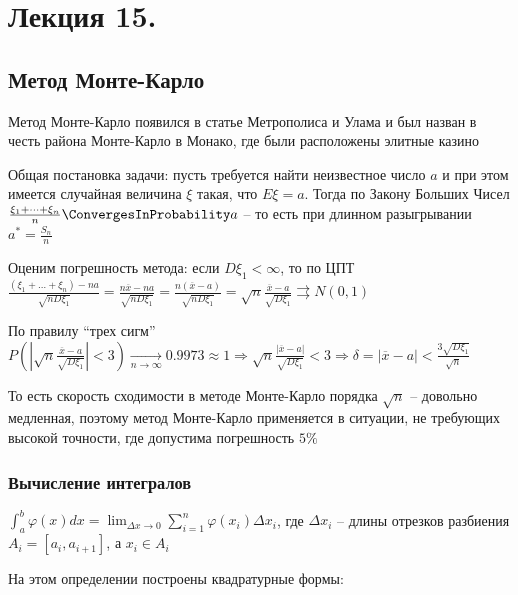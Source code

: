 \documentclass[12pt]{article}
\begin{document}





\section{Лекция 15.}

\subsection{Метод Монте-Карло}

\hypertarget{monte_carlo}{}

Метод Монте-Карло появился в статье Метрополиса и Улама и был назван в честь района Монте-Карло в Монако, где были расположены элитные казино


Общая постановка задачи: пусть требуется найти неизвестное число $a$ и при этом имеется случайная величина $\xi$ такая, что $E \xi = a$. Тогда по Закону Больших Чисел $\frac{\xi_1 + \dots + \xi_n}{n} \ConvergesInProbability a$ -- то есть при длинном разыгрывании $a^* = \frac{S_n}{n}$

Оценим погрешность метода: если $D\xi_1 < \infty$, то по ЦПТ $\frac{(\xi_1 + \dots + \xi_n) - n a}{\sqrt{n D \xi_1}} = \frac{n \overline{x} - na}{\sqrt{n D\xi_1}} = \frac{n(\overline{x} - a)}{\sqrt{n D\xi_1}} = \sqrt{n} \frac{\overline{x} - a}{\sqrt{D\xi_1}} \rightrightarrows N(0, 1)$

По правилу \enquote{трех сигм} $P\left(\left|\sqrt{n} \frac{\overline{x} - a}{\sqrt{D\xi_1}}\right| < 3\right) \underset{n \to \infty}{\longrightarrow} 0.9973 \approx 1 \Longrightarrow \sqrt{n} \frac{|\overline{x} - a|}{\sqrt{D \xi_1}} < 3 \Longrightarrow \delta = |\overline{x} - a| < \frac{3\sqrt{D\xi_1}}{\sqrt{n}}$

\Nota То есть скорость сходимости в методе Монте-Карло порядка $\sqrt{n}$ -- довольно медленная, поэтому метод Монте-Карло применяется в ситуации, не требующих высокой точности, где допустима погрешность $5\%$

\subsubsection{Вычисление интегралов}

\Mem $\int_a^b \varphi(x) dx = \lim_{\Delta x \to 0} \sum_{i = 1}^n \varphi(x_i) \Delta x_i$, где $\Delta x_i$ -- длины отрезков разбиения $A_i = [a_i, a_{i + 1}]$, а $x_i \in A_i$

На этом определении построены квадратурные формы:
\end{document}

